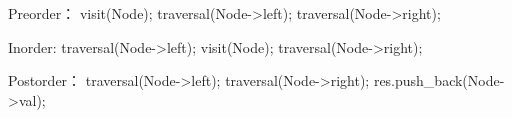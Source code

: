 Preorder：
	visit(Node);
	traversal(Node->left);
	traversal(Node->right);



Inorder:
	traversal(Node->left);
	visit(Node);
	traversal(Node->right);




Postorder：
	traversal(Node->left);
	traversal(Node->right);
	res.push_back(Node->val);

